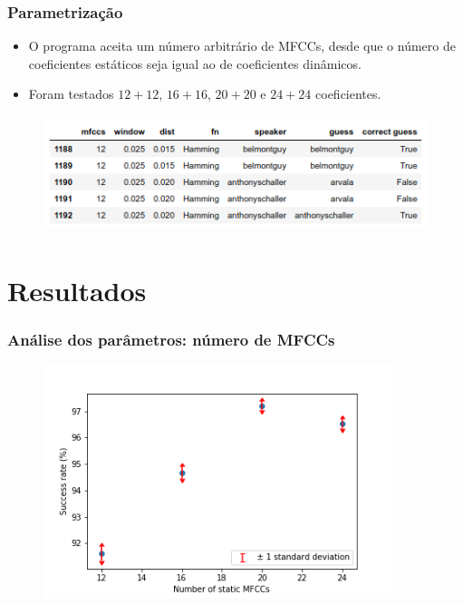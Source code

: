 \documentclass{beamer}
\begin{document}
\begin{frame} %
    \frametitle{Parametrização}

    \begin{itemize}
        \item O programa aceita um número arbitrário de MFCCs, desde que o número de coeficientes estáticos seja igual ao de coeficientes dinâmicos.
        \bigskip
        \item Foram testados $12+12$, $16+16$, $20+20$ e $24+24$ coeficientes.
    \end{itemize}

    \begin{figure}
        \centering
        \includegraphics[height=97pt]{Figure_7.png}
    \end{figure}

\end{frame}



\section{Resultados}

\begin{frame}
    \frametitle{Análise dos parâmetros: número de MFCCs}

    \begin{figure}[]
        \centering
        \includegraphics[height=192pt]{Figure_1.png}
    \end{figure}

\end{frame}
\end{document}
